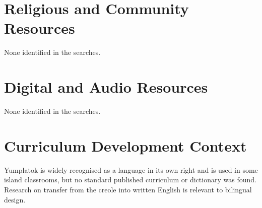 \documentclass[12pt]{article}
\begin{document}
\section{Religious and Community Resources}
None identified in the searches.
\section{Digital and Audio Resources}
None identified in the searches.
\section{Curriculum Development Context}
Yumplatok is widely recognised as a language in its own right and is used in some island classrooms, but no standard published curriculum or dictionary was found. Research on transfer from the creole into written English is relevant to bilingual design.
\end{document}
